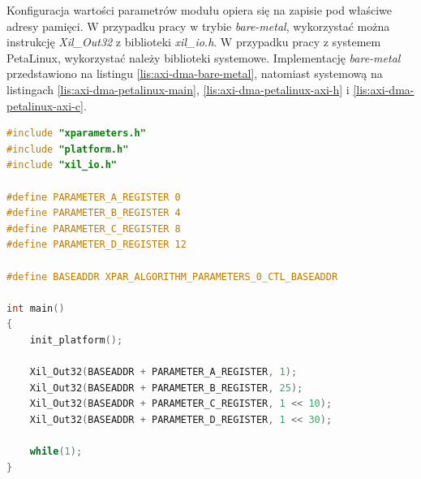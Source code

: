 Konfiguracja wartości parametrów modułu opiera się na zapisie pod właściwe adresy pamięci. %
W przypadku pracy w trybie \textit{bare-metal}, wykorzystać można instrukcję \emph{Xil\_Out32} z biblioteki \emph{xil\_io.h}. 
W przypadku pracy z systemem PetaLinux, wykorzystać należy biblioteki systemowe. 
Implementację \textit{bare-metal} przedstawiono na listingu \ref{lis:axi-dma-bare-metal}, natomiast systemową na listingach \ref{lis:axi-dma-petalinux-main}, \ref{lis:axi-dma-petalinux-axi-h} i \ref{lis:axi-dma-petalinux-axi-c}.

\begin{lstlisting}[breaklines, language=C, label=lis:axi-dma-bare-metal, caption=Obsługa modułu w trybie bare-metal.]
#include "xparameters.h"
#include "platform.h"
#include "xil_io.h"

#define PARAMETER_A_REGISTER 0
#define PARAMETER_B_REGISTER 4
#define PARAMETER_C_REGISTER 8
#define PARAMETER_D_REGISTER 12

#define BASEADDR XPAR_ALGORITHM_PARAMETERS_0_CTL_BASEADDR

int main()
{
	init_platform();
	
	Xil_Out32(BASEADDR + PARAMETER_A_REGISTER, 1);
	Xil_Out32(BASEADDR + PARAMETER_B_REGISTER, 25);
	Xil_Out32(BASEADDR + PARAMETER_C_REGISTER, 1 << 10);
	Xil_Out32(BASEADDR + PARAMETER_D_REGISTER, 1 << 30);
	
	while(1);
}
\end{lstlisting}


